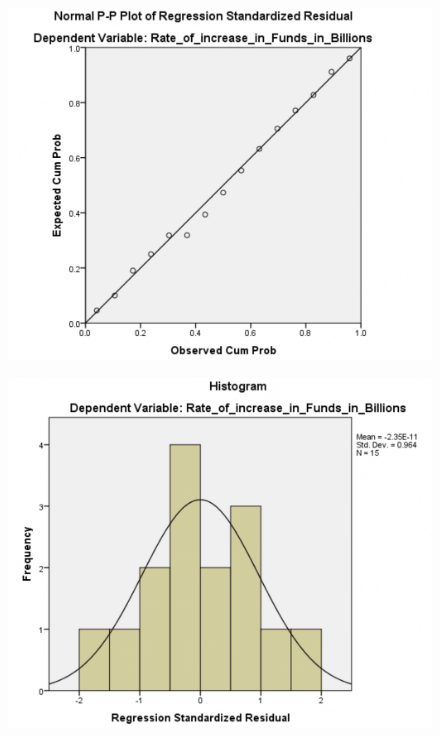 \documentclass[11pt, journal,letterpaper,compsoc]{IEEEtran}
\begin{document}
\begin{figure}  [h!]
\includegraphics[width=\linewidth]{images/observed-cum-prob}
\end{figure}

\begin{figure}  [h!]
\includegraphics[width=\linewidth]{images/histogram}
\end{figure}
\end{document}
